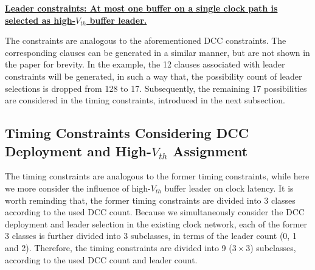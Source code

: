 \noindent \textbf{\uline{Leader constraints: At most one buffer on a single clock path is selected as high-$V_{th}$ buffer leader.}}

The constraints are analogous to the aforementioned DCC constraints. The corresponding clauses can be generated in a similar manner, but are not shown in the paper for brevity. In the example, the 12 clauses associated with leader constraints will be generated, in such a way that, the possibility count of leader selections is dropped from 128 to 17. Subsequently, the remaining 17 possibilities are considered in the timing constraints, introduced in the next subsection.

\subsection{Timing Constraints Considering DCC Deployment and High-$V_{th}$ Assignment}
\label{sec:VTA:timing}
The timing constraints are analogous to the former timing constraints, while here we more consider the influence of high-$V_{th}$ buffer leader on clock latency. It is worth reminding that, the former timing constraints are divided into 3 classes according to the used DCC count. Because we simultaneously consider the DCC deployment and leader selection in the existing clock network, each of the former 3 classes is further divided into 3 subclasses, in terms of the leader count (0, 1 and 2). Therefore, the timing constraints are divided into 9 ($3 \times 3$) subclasses, according to the used DCC count and leader count.

